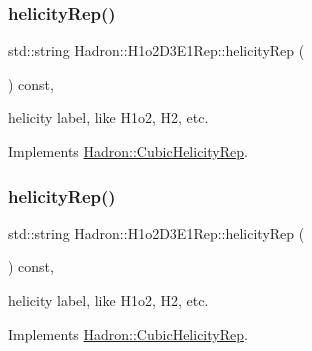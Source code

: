 \mbox{\label{structHadron_1_1H1o2D3E1Rep_a3bdf25355e5b97ee29fab2675ab309a5}} 
\subsubsection{\texorpdfstring{helicityRep()}{helicityRep()}\hspace{0.1cm}{\footnotesize\ttfamily [1/2]}}
{\footnotesize\ttfamily std\+::string Hadron\+::\+H1o2\+D3\+E1\+Rep\+::helicity\+Rep (\begin{DoxyParamCaption}{ }\end{DoxyParamCaption}) const\hspace{0.3cm}{\ttfamily [inline]}, {\ttfamily [virtual]}}

helicity label, like H1o2, H2, etc. 

Implements \mbox{\hyperlink{structHadron_1_1CubicHelicityRep_af1096946b7470edf0a55451cc662f231}{Hadron\+::\+Cubic\+Helicity\+Rep}}.

\mbox{\label{structHadron_1_1H1o2D3E1Rep_a3bdf25355e5b97ee29fab2675ab309a5}} 
\subsubsection{\texorpdfstring{helicityRep()}{helicityRep()}\hspace{0.1cm}{\footnotesize\ttfamily [2/2]}}
{\footnotesize\ttfamily std\+::string Hadron\+::\+H1o2\+D3\+E1\+Rep\+::helicity\+Rep (\begin{DoxyParamCaption}{ }\end{DoxyParamCaption}) const\hspace{0.3cm}{\ttfamily [inline]}, {\ttfamily [virtual]}}

helicity label, like H1o2, H2, etc. 

Implements \mbox{\hyperlink{structHadron_1_1CubicHelicityRep_af1096946b7470edf0a55451cc662f231}{Hadron\+::\+Cubic\+Helicity\+Rep}}.

\mbox{\label{structHadron_1_1H1o2D3E1Rep_a06bc9c58f069a4734422133269965d64}} 
